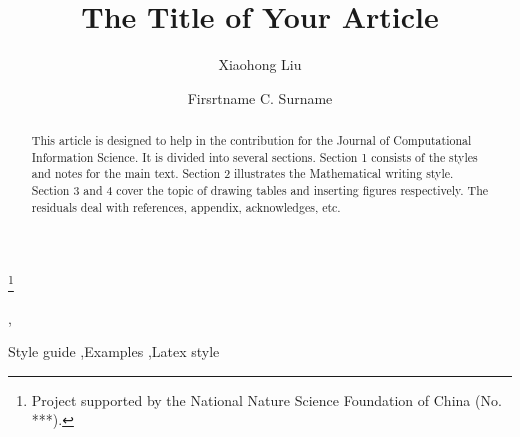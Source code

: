 \documentclass[print]{jicspack}
\begin{document}
\begin{premaker}


\title{The Title of Your Article}
\thanks[label1]{Project supported by the National Nature Science Foundation of China (No. ***).}
\author[author1]{Xiaohong Liu},
\author[author2]{Firsrtname C. Surname}
\address[author1]{Institute of Mathematical Sciences, Dalian University of Technology, Dalian 116024, China}
\address[author2]{Address for 2nd author}

\begin{abstract}
This article is designed to help in the contribution for the Journal of Computational Information Science.
It is divided into several sections.
Section 1 consists of the styles and notes for the main text.
Section 2 illustrates the Mathematical writing style.
Section 3 and 4 cover the topic of drawing tables and inserting figures respectively.
The residuals deal with references, appendix, acknowledges, etc.
\end{abstract}
\begin{keyword}
Style guide \sep Examples \sep Latex style
\end{keyword}
\end{premaker}

\end{document}
